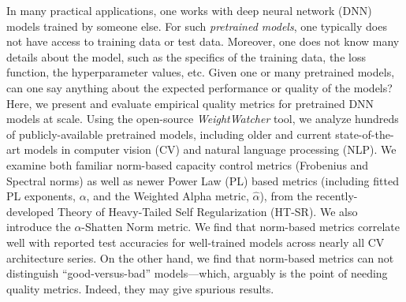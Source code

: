
In many practical applications, one works with deep neural network (DNN) models trained by someone else.
For such \emph{pretrained models}, one typically does not have access to training data or test data.
Moreover, one does not know many details about the model, such as the specifics of the training data, the loss function, the hyperparameter values, etc.
Given one or many pretrained models, can one say anything about the expected performance or quality of the models?
Here, we present and evaluate empirical quality metrics for pretrained DNN models at scale.
%
Using the open-source \emph{WeightWatcher} tool, we analyze hundreds of publicly-available pretrained models, including older and current state-of-the-art models in computer vision (CV) and natural language processing (NLP).
We examine both familiar norm-based capacity control metrics (Frobenius and Spectral norms) as well as newer Power Law (PL) based metrics (including fitted PL exponents, $\alpha$, and the Weighted Alpha metric, $\hat{\alpha}$), from the recently-developed Theory of Heavy-Tailed Self Regularization (HT-SR).
We also introduce the $\alpha$-Shatten Norm metric.
We find that norm-based metrics correlate well with reported test accuracies for well-trained models across nearly all CV architecture series.
On the other hand, we find that norm-based metrics can not distinguish ``good-versus-bad'' models---which, arguably is the point of needing quality metrics.  
Indeed, they may give spurious results.

